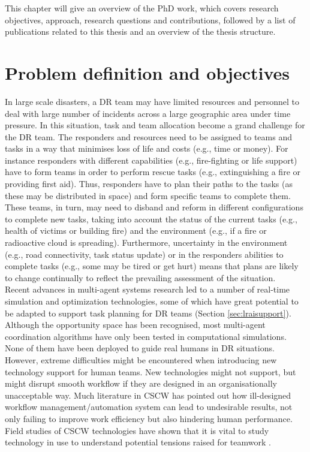 This chapter will give an overview of the PhD work, which covers research objectives, approach, research questions and contributions, followed by a list of publications related to this thesis and an overview of the thesis structure.\\


\section{Problem definition and objectives}
In large scale disasters, a \ac{DR} team may have limited resources and personnel to deal with large number of incidents across a large geographic area under time pressure. In this situation, task and team allocation become a grand challenge for the \ac{DR} team. The responders and resources need to be assigned to teams and tasks in a way that minimises loss of life and costs (e.g., time or money). For instance responders with different capabilities (e.g., fire-fighting or life support) have to form teams in order to perform rescue tasks (e.g., extinguishing a fire or providing first aid). Thus, responders have to plan their paths to the tasks (as these may be distributed in space) and form specific teams to complete them. These teams, in turn, may need to disband and reform in different configurations to complete new tasks, taking into account the status of the current tasks (e.g., health of victims or building fire) and the environment (e.g., if a fire or radioactive cloud is spreading). Furthermore, uncertainty in the environment (e.g., road connectivity, task status update) or in the responders abilities to complete tasks (e.g., some may be tired or get hurt) means that plans are likely to change continually to reflect the prevailing assessment of the situation.\\

Recent advances in multi-agent systems research led to a number of real-time simulation and optimization technologies, some of which have great potential to be adapted to support task planning for \ac{DR} teams (Section \ref{sec:lraisupport}). Although the opportunity space has been recognised, most multi-agent coordination algorithms have only been tested in computational simulations. None of them have been deployed to guide real humans in \ac{DR} situations. However, extreme difficulties might be encountered when introducing new technology support for human teams. New technologies might not support, but might disrupt smooth workflow if they are designed in an organisationally unacceptable way. Much literature in \ac{CSCW} has pointed out how ill-designed workflow management/automation system can lead to undesirable results, not only failing to improve work efficiency but also hindering human performance. Field studies of \ac{CSCW} technologies have shown that it is vital to study technology in use to understand potential tensions raised for teamwork \citep{Bowers1994}. \\

